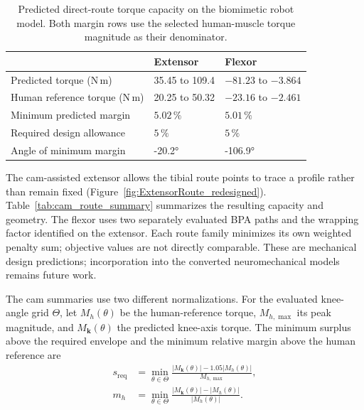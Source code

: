 \begin{table}[htbp]
\centering
\caption{Predicted direct-route torque capacity on the biomimetic robot model. Both margin rows use the selected human-muscle torque magnitude as their denominator.}
\label{tab:redesigned_route_capacity}
\small
\begin{tabularx}{\textwidth}{@{}lXX@{}}
\toprule
 & \textbf{Extensor} & \textbf{Flexor}\\
\midrule
Predicted torque (N\,m) & 35.45 to 109.4 & $-81.23$ to $-3.864$\\
Human reference torque (N\,m) & 20.25 to 50.32 & $-23.16$ to $-2.461$\\
Minimum predicted margin & $5.02\,\%$ & $5.01\,\%$\\
Required design allowance & $5\,\%$ & $5\,\%$\\
Angle of minimum margin & \ang{-20.2} & \ang{-106.9}\\
\bottomrule
\end{tabularx}
\end{table}

The cam-assisted extensor allows the tibial route points to trace a profile rather than remain fixed (Figure~\ref{fig:ExtensorRoute_redesigned}). Table~\ref{tab:cam_route_summary} summarizes the resulting capacity and geometry. The flexor uses two separately evaluated BPA paths and the wrapping factor identified on the extensor. Each route family minimizes its own weighted penalty sum; objective values are not directly comparable. These are mechanical design predictions; incorporation into the converted neuromechanical models remains future work.

The cam summaries use two different normalizations. For the evaluated knee-angle grid $\Theta$, let $M_h(\theta)$ be the human-reference torque, $M_{h,\max}$ its peak magnitude, and $M_{\mathbf{k}}(\theta)$ the predicted knee-axis torque. The minimum surplus above the required envelope and the minimum relative margin above the human reference are
\begin{equation}
\begin{aligned}
s_{\mathrm{req}} &= \min_{\theta\in\Theta}\frac{\lvert M_{\mathbf{k}}(\theta)\rvert-1.05\lvert M_h(\theta)\rvert}{M_{h,\max}},\\
m_h &= \min_{\theta\in\Theta}\frac{\lvert M_{\mathbf{k}}(\theta)\rvert-\lvert M_h(\theta)\rvert}{\lvert M_h(\theta)\rvert}.
\end{aligned}
\label{eq:cam_summary_definitions}
\end{equation}


